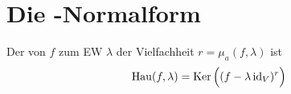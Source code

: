 \section{Die -Normalform}

\begin{definition}[Hauptraum]
	Der  von $f$ zum EW $\lambda$ der Vielfachheit $r=\mu_a(f,\lambda)$ ist
	\begin{align}
		\operatorname{Hau}(f,\lambda)=\operatorname{Ker}\Big( (f-\lambda\operatorname{id}_V)^r\Big) \notag
	\end{align}
\end{definition}